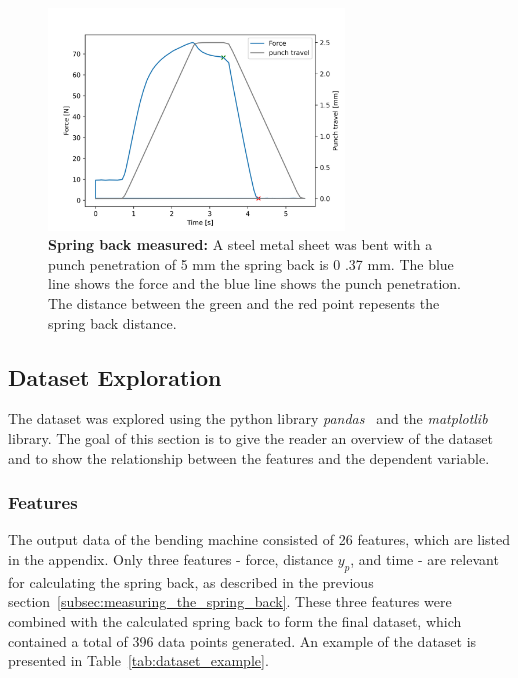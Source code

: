 \begin{figure}[H]
    \begin{tcolorbox}[arc=0pt,boxrule=0.5pt]
        \centering
        \includegraphics[width=0.7\textwidth]{chap4/images/springback_measured}
    \end{tcolorbox}
    \caption{\textbf{Spring back measured:} A steel metal sheet was bent with a punch penetration of 5
    mm the spring back is 0 .37 mm. The blue line shows the force and the blue line shows the punch penetration.
    The distance between the green and the red point repesents the spring back distance.}
    \label{fig:springback_measured}
\end{figure}

\subsection{Dataset Exploration}\label{subsec:dataset-exploration}
The dataset was explored using the python library \textit{pandas}~\cite{mckinney-proc-scipy-2010}
and the \textit{matplotlib}~\cite{Hunter:2007} library.
The goal of this section is to give the reader an overview of the dataset and
to show the relationship between the features and the dependent variable.

\subsubsection{Features}
The output data of the bending machine consisted of 26 features, which are listed in
the appendix.
Only three features - force, distance $y_p$, and time - are relevant for
calculating the spring back, as described in the previous section~\ref{subsec:measuring_the_spring_back}.
These three features were combined with the calculated spring back to form the final
dataset, which contained a total of 396 data points generated.
An example of the dataset is presented in Table~\ref{tab:dataset_example}.

